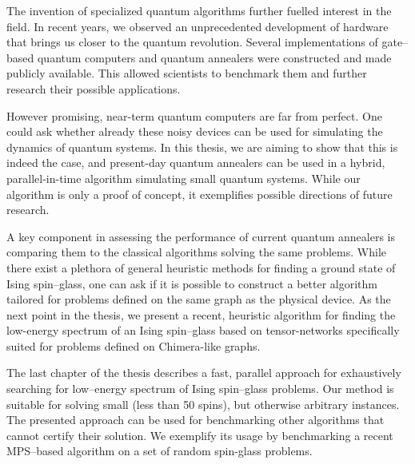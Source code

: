 The invention of specialized quantum algorithms further fuelled interest in the field. In recent years, we observed an unprecedented development of hardware that brings us closer to the quantum revolution. Several implementations of gate--based quantum computers \cite{ionq, bohnet} and quantum annealers \cite{johnson, dattani} were constructed and made publicly available. This allowed scientists to benchmark them and further research their possible applications.

However promising, near-term quantum computers are far from perfect. One could ask whether already
these noisy devices can be used for simulating the dynamics of quantum systems. In this thesis, we
are aiming to show that this is indeed the case, and present-day quantum annealers can be used in a
hybrid, parallel-in-time algorithm simulating small quantum systems. While our algorithm is only a
proof of concept, it exemplifies possible directions of future research.

A key component in assessing the performance of current quantum annealers is comparing them to the
classical algorithms solving the same problems. While there exist a plethora of general heuristic
methods for finding a ground state of Ising spin--glass, one can ask if it is possible to construct
a better algorithm tailored for problems defined on the same graph as the physical device. As the
next point in the thesis, we present a recent, heuristic algorithm for finding the low-energy
spectrum of an Ising spin--glass based on tensor-networks specifically suited for problems defined
on Chimera-like graphs.

The last chapter of the thesis describes a fast, parallel approach for exhaustively searching for
low--energy spectrum of Ising spin--glass problems. Our method is suitable for solving small (less
than 50 spins), but otherwise arbitrary instances. The presented approach can be used for
benchmarking other algorithms that cannot certify their solution. We exemplify its usage by
benchmarking a recent MPS--based algorithm on a set of random spin-glass problems.

